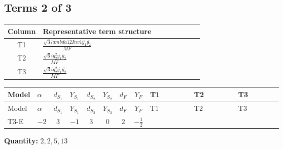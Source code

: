 \documentclass[8pt]{article}
\begin{document}
\begin{landscape}
\subsection*{Terms 2 of 3}
\begin{center}
\begin{tabular}{@{}c >{\raggedright\arraybackslash}p{0.82\linewidth}@{}}
\toprule
Column & Representative term structure \\
\midrule
T1 & \(\displaystyle \frac{\sqrt{3} lambda12Inv1 \overline{y_{1}} \overline{y_{2}}}{MF}\) \\
\midrule
T2 & \(\displaystyle \frac{\sqrt{6} i g_{2}^{2} \overline{y_{1}} \overline{y_{2}}}{MF}\) \\
\midrule
T3 & \(\displaystyle \frac{\sqrt{3} i g_{2}^{2} \overline{y_{1}} \overline{y_{2}}}{MF}\) \\
\midrule
\bottomrule
\end{tabular}
\end{center}
\smallskip
\tiny
\begin{longtable}{@{}llcccccc >{\raggedright\arraybackslash}p{0.21\linewidth} >{\raggedright\arraybackslash}p{0.21\linewidth} >{\raggedright\arraybackslash}p{0.21\linewidth}@{}}
\toprule
Model & $\alpha$ & $d_{S_1}$ & $Y_{S_1}$ & $d_{S_2}$ & $Y_{S_2}$ & $d_F$ & $Y_F$ & T1 & T2 & T3 \\
\midrule
\endfirsthead
\toprule
Model & $\alpha$ & $d_{S_1}$ & $Y_{S_1}$ & $d_{S_2}$ & $Y_{S_2}$ & $d_F$ & $Y_F$ & T1 & T2 & T3 \\
\midrule
\endhead
T3-E & $-2$ & $3$ & $-1$ & $3$ & $0$ & $2$ & $-\frac{1}{2}$ & \scriptsize\adjustbox{max width=\linewidth}{$\begin{gathered} \frac{\sqrt{3} lambda12Inv1 \overline{y_{1}} \overline{y_{2}}}{6 MF}\end{gathered}$} & \scriptsize\adjustbox{max width=\linewidth}{$\begin{gathered} \frac{\sqrt{6} i g_{2}^{2} \overline{y_{1}} \overline{y_{2}}}{3 MF}\end{gathered}$} & \scriptsize\adjustbox{max width=\linewidth}{$\begin{gathered} \frac{\sqrt{3} i g_{2}^{2} \overline{y_{1}} \overline{y_{2}}}{6 MF}\end{gathered}$} \\
\midrule
\bottomrule
\end{longtable}
\clearpage
\noindent\textbf{Quantity: }$\mathrm{2,2,5,13}$\par\smallskip

\end{landscape}
\end{document}
